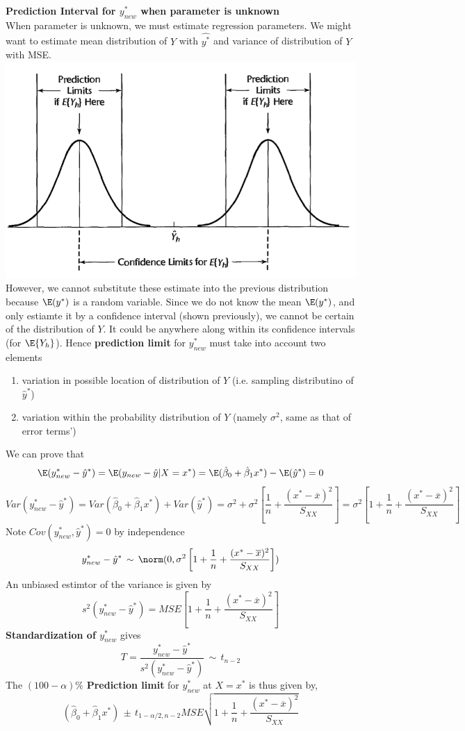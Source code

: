 \documentclass[11pt]{article}
\begin{document}
\begin{defn*}
	\textbf{Prediction Interval for $y^*_{new}$ when parameter is unknown} \\
	When parameter is unknown, we must estimate regression parameters. We might want to estimate mean distribution of $Y$ with $\hat{y^*}$ and variance of distribution of $Y$ with MSE. 
	\includegraphics[width=\textwidth/2]{prediction_interval_conf_lim}  \\
	However, we cannot substitute these estimate into the previous distribution because $\E(y^*)$ is a random variable. Since we do not know the mean $\E(y^*)$, and only estiamte it by a confidence interval (shown previously), we cannot be certain of the distribution of $Y$. It could be anywhere along within its confidence intervals (for $\E\{Y_h\}$). Hence \textbf{prediction limit} for $y^*_{new}$ must take into account two elements
	\begin{enumerate}
		\item variation in possible location of distribution of $Y$ (i.e. sampling distributino of $\hat{y}^*$)
		\item variation within the probability distribution of $Y$ (namely $\sigma^2$, same as that of error terms')
	\end{enumerate}
	We can prove that
	\[
		\E(y^*_{new} - \hat{y}^*) 
		= \E(y_{new} - \hat{y}|X = x^*)
		= \E(\hat{\beta}_0 + \hat{\beta}_1 x^*) - \E(\hat{y}^*) 
		= 0
	\]
	\[
		Var(y^*_{new} - \hat{y}^*) 
		= Var(\hat{\beta}_0 + \hat{\beta}_1 x^*) + Var(\hat{y}^*)
		= \sigma^2 + \sigma^2 \left[ \frac{1}{n} + \frac{(x^* - \overline{x})^2}{S_{XX}} \right]
		= \sigma^2 \left[ 1+ \frac{1}{n} +\frac{(x^* - \overline{x})^2}{S_{XX}} \right]
	\]
	Note $Cov(y^*_{new}, \hat{y}^*) = 0$ by independence
	\[
		y^*_{new} - \hat{y}^* \, \sim \, \norm(0, \sigma^2 \left[ 1+ \frac{1}{n} +\frac{(x^* - \overline{x})^2}{S_{XX}} \right])
	\]
	An unbiased estimtor of the variance is given by 
	\[
		s^2(y^*_{new} - \hat{y}^*) = MSE \left[ 1+ \frac{1}{n} +\frac{(x^* - \overline{x})^2}{S_{XX}} \right]
	\]
	\textbf{Standardization of $y^*_{new}$} gives 
	\[
		T = \frac{y^*_{new} - \hat{y}^*}{s^2(y^*_{new} - \hat{y}^*)} \, \sim \, t_{n-2}
	\]
	The $(100-\alpha)\%$ \textbf{Prediction limit} for $y^*_{new}$ at $X=x^*$ is thus given by,
	\[
		(\hat{\beta}_0 + \hat{\beta}_1 x^*) \, \pm \, t_{1-\alpha/2, n-2} MSE \sqrt{1+ \frac{1}{n} +\frac{(x^* - \overline{x})^2}{S_{XX}} } 
	\]
\end{defn*}
\end{document}
